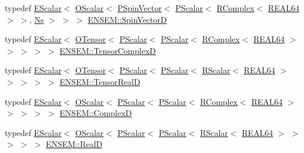 \begin{DoxyCompactItemize}
\item 
typedef \mbox{\hyperlink{classENSEM_1_1EScalar}{E\+Scalar}}$<$ \mbox{\hyperlink{classENSEM_1_1OScalar}{O\+Scalar}}$<$ \mbox{\hyperlink{classENSEM_1_1PSpinVector}{P\+Spin\+Vector}}$<$ \mbox{\hyperlink{classENSEM_1_1PScalar}{P\+Scalar}}$<$ \mbox{\hyperlink{classENSEM_1_1RComplex}{R\+Complex}}$<$ \mbox{\hyperlink{namespaceENSEM_a85b215b9f1f43715aebee01718e25082}{R\+E\+A\+L64}} $>$ $>$, \mbox{\hyperlink{namespaceENSEM_a6f05e048f9b2eb1a19131074f8abc25f}{Ns}} $>$ $>$ $>$ \mbox{\hyperlink{group__defs_ga9fdac1b0bfb17e095eb78a356858681b}{E\+N\+S\+E\+M\+::\+Spin\+VectorD}}
\item 
typedef \mbox{\hyperlink{classENSEM_1_1EScalar}{E\+Scalar}}$<$ \mbox{\hyperlink{classENSEM_1_1OTensor}{O\+Tensor}}$<$ \mbox{\hyperlink{classENSEM_1_1PScalar}{P\+Scalar}}$<$ \mbox{\hyperlink{classENSEM_1_1PScalar}{P\+Scalar}}$<$ \mbox{\hyperlink{classENSEM_1_1RComplex}{R\+Complex}}$<$ \mbox{\hyperlink{namespaceENSEM_a85b215b9f1f43715aebee01718e25082}{R\+E\+A\+L64}} $>$ $>$ $>$ $>$ $>$ \mbox{\hyperlink{group__defs_ga36b77f1fc618cfdb020d0b95710f1f87}{E\+N\+S\+E\+M\+::\+Tensor\+ComplexD}}
\item 
typedef \mbox{\hyperlink{classENSEM_1_1EScalar}{E\+Scalar}}$<$ \mbox{\hyperlink{classENSEM_1_1OTensor}{O\+Tensor}}$<$ \mbox{\hyperlink{classENSEM_1_1PScalar}{P\+Scalar}}$<$ \mbox{\hyperlink{classENSEM_1_1PScalar}{P\+Scalar}}$<$ \mbox{\hyperlink{classENSEM_1_1RScalar}{R\+Scalar}}$<$ \mbox{\hyperlink{namespaceENSEM_a85b215b9f1f43715aebee01718e25082}{R\+E\+A\+L64}} $>$ $>$ $>$ $>$ $>$ \mbox{\hyperlink{group__defs_gacf3d977d3ad24e35a7d782ef367c6c5c}{E\+N\+S\+E\+M\+::\+Tensor\+RealD}}
\item 
typedef \mbox{\hyperlink{classENSEM_1_1EScalar}{E\+Scalar}}$<$ \mbox{\hyperlink{classENSEM_1_1OScalar}{O\+Scalar}}$<$ \mbox{\hyperlink{classENSEM_1_1PScalar}{P\+Scalar}}$<$ \mbox{\hyperlink{classENSEM_1_1PScalar}{P\+Scalar}}$<$ \mbox{\hyperlink{classENSEM_1_1RComplex}{R\+Complex}}$<$ \mbox{\hyperlink{namespaceENSEM_a85b215b9f1f43715aebee01718e25082}{R\+E\+A\+L64}} $>$ $>$ $>$ $>$ $>$ \mbox{\hyperlink{group__defs_gaf38ee8c84f090ee0c3b76e7a384fb316}{E\+N\+S\+E\+M\+::\+ComplexD}}
\item 
typedef \mbox{\hyperlink{classENSEM_1_1EScalar}{E\+Scalar}}$<$ \mbox{\hyperlink{classENSEM_1_1OScalar}{O\+Scalar}}$<$ \mbox{\hyperlink{classENSEM_1_1PScalar}{P\+Scalar}}$<$ \mbox{\hyperlink{classENSEM_1_1PScalar}{P\+Scalar}}$<$ \mbox{\hyperlink{classENSEM_1_1RScalar}{R\+Scalar}}$<$ \mbox{\hyperlink{namespaceENSEM_a85b215b9f1f43715aebee01718e25082}{R\+E\+A\+L64}} $>$ $>$ $>$ $>$ $>$ \mbox{\hyperlink{group__defs_ga6436522708cc37b1cb43676ea3b4b2fd}{E\+N\+S\+E\+M\+::\+RealD}}

\end{DoxyCompactItemize}
